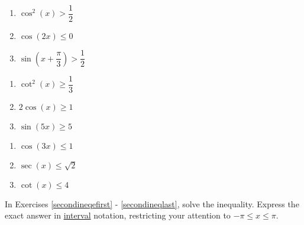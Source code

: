 \begin{multicols}{3}

\begin{enumerate}

\setcounter{enumi}{\value{HW}}

\item $\cos^{2} \left( x \right) > \dfrac{1}{2}$
\item $\cos \left( 2x \right) \leq 0$ 
\item $\sin \left( x + \dfrac{\pi}{3} \right) > \dfrac{1}{2}$

\setcounter{HW}{\value{enumi}}

\end{enumerate}

\end{multicols}

\begin{multicols}{3}

\begin{enumerate}

\setcounter{enumi}{\value{HW}}

\item $\cot^{2} \left( x \right) \geq \dfrac{1}{3}$
\item $2\cos(x) \geq 1$ 
\item $\sin(5x) \geq 5$ 

\setcounter{HW}{\value{enumi}}

\end{enumerate}

\end{multicols}

\begin{multicols}{3}

\begin{enumerate}

\setcounter{enumi}{\value{HW}}

\item $\cos(3x) \leq 1$
\item $\sec(x) \leq \sqrt{2}$
\item $\cot(x) \leq 4$ \label{firstineqlast}

\setcounter{HW}{\value{enumi}}
\end{enumerate}
\end{multicols}

\pagebreak

In Exercises \ref{secondineqefirst} - \ref{secondineqlast}, solve the inequality.  Express the exact answer in \underline{interval} notation, restricting your attention to $-\pi \leq x \leq \pi$.

